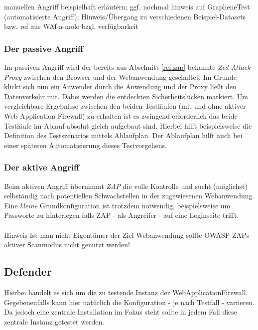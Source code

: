 \begin{neu}
manuellen Angriff beispielhaft erläutern; ggf. nochmal hinweis auf GrapheneTest (automatisierte Angriff); Hinweis/Übergang zu verschiedenen Beispiel-Datasets bzw. ref aus WAf-a-mole bzgl. verfügbarkeit
\end{neu}


\subsubsection{Der passive Angriff}
Im passiven Angriff wird der bereits aus Abschnitt \ref{ref:zap} bekannte \emph{Zed Attack Proxy} zwischen den Browser und der Webanwendung geschaltet. Im Grunde klickt sich nun ein Anwender durch die Anwendung und der Proxy ließt den Datenverkehr mit. Dabei werden die entdeckten Sicherheitslücken markiert. Um vergleichbare Ergebnisse zwischen den beiden Testläufen (mit und ohne aktiver Web Application Firewall) zu erhalten ist es zwingend erforderlich das beide Testläufe im Ablauf absolut gleich aufgebaut sind. Hierbei hilft beispielsweise die Definition des Testszenarios mittels Ablaufplan. Der Ablaufplan hilft auch bei einer späteren Automatisierung dieses Testvorgehens.

\subsubsection{Der aktive Angriff}
Beim aktiven Angriff übernimmt \emph{ZAP} die volle Kontrolle und sucht (möglichst) selbständig nach potentiellen Schwachstellen in der zugewiesenen Webanwendung. Eine \emph{kleine} Grundkonfiguration ist trotzdem notwendig, beispielsweise um Passworte zu hinterlegen falls ZAP - als Angreifer - auf eine Loginseite trifft. \\\\
\textcolor{bhtGray}{ Hinweis} Ist man nicht Eigentümer der Ziel-Webanwendung sollte OWASP ZAPs aktiver Scanmodus nicht genutzt werden!\\


\subsection{Defender}

Hierbei handelt es sich um die zu testende Instanz der WebApplicationFirewall. Gegebenenfalls kann hier natürlich die Konfiguration - je nach Testfall - variieren. Da jedoch eine zentrale Installation im Fokus steht sollte in jedem Fall diese zentrale Instanz getestet werden.

